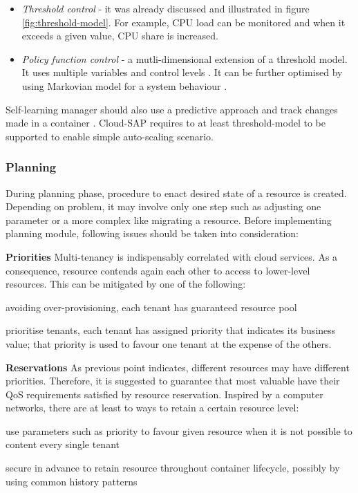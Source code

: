 \begin{asparaenum}
    \begin{itemize}
     \item \emph{Threshold control} - it was already discussed and illustrated in figure \ref{fig:threshold-model}. For example, CPU load can be monitored and when it exceeds a given value, CPU share is increased.
     \item \emph{Policy function control} - a mutli-dimensional extension of a threshold model. It uses multiple variables and control levels \cite{abdeen2002seeking}. It can be further optimised by using Markovian model for a system behaviour \cite{ye2000markov}.     
    \end{itemize}
\end{asparaenum}
Self-learning manager should also use a predictive approach \cite{JiPeLiCh11} and track changes made in a container \cite{ZhYaWo05}. Cloud-SAP requires to at least threshold-model \cite{tong1978threshold} to be supported to enable simple auto-scaling scenario.

\subsubsection{Planning}
During planning phase, procedure to enact desired state of a resource is created. Depending on problem, it may involve only one step such as adjusting one parameter or a more complex like migrating a resource. Before implementing planning module, following issues should be taken into consideration:
\begin{asparaenum}
 \item[\textbf{Priorities}] Multi-tenancy is indispensably correlated with cloud services. As a consequence, resource contends again each other to access to lower-level resources. This can be mitigated by one of the following: \begin{inparaenum}[1)]
    \item avoiding over-provisioning, each tenant has guaranteed resource pool
    \item prioritise tenants, each tenant has assigned priority that indicates its business value; that priority is used to favour one tenant at the expense of the others.
 \end{inparaenum}
 
 \item[\textbf{Reservations}] As previous point indicates, different resources may have different priorities. Therefore, it is suggested to guarantee that most valuable have their QoS requirements satisfied by resource reservation. Inspired by a computer networks, there are at least to ways to retain a certain resource level: 
\begin{inparaenum}[1)]
    \item use parameters such as priority to favour given resource when it is not possible to content every single tenant \cite{nichols1998definition}
    \item secure in advance to retain resource throughout container lifecycle, possibly by using common history patterns \cite{braden1997resource}
 \end{inparaenum}
\end{asparaenum}

